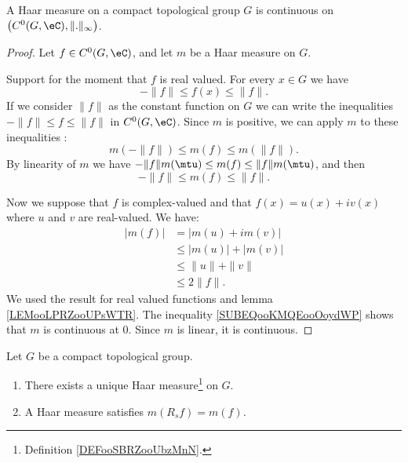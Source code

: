 \begin{lemma}     \label{LEMooRWOFooDOSUYo}
    A Haar measure on a compact topological group \( G\) is continuous on \( \big( C^0(G,\eC), \| . \|_{\infty} \big)\).
\end{lemma}

\begin{proof}
    Let \( f\in C^0(G,\eC)\), and let \( m\) be a Haar measure on \( G\). 

    Support for the moment that \( f\) is real valued. For every \( x\in G\) we have
    \begin{equation}
        -\| f \|\leq f(x)\leq \| f \|.
    \end{equation}
    If we consider \( \| f \|\) as the constant function on \( G\) we can write the inequalities \( -\| f \|\leq f\leq \| f \|\) in \( C^0(G,\eC)\).  Since \( m\) is positive, we can apply \( m\) to these inequalities :
    \begin{equation}
        m(-\| f \|)\leq m(f)\leq m(\| f \|).
    \end{equation}
    By linearity of \( m\) we have \( -\| f \|m(\mtu)\leq m(f)\leq \| f \|m(\mtu)\), and then
    \begin{equation}
        -\| f \|\leq m(f)\leq \| f \|.
    \end{equation}
    
    Now we suppose that \( f\) is complex-valued and that \( f(x)=u(x)+iv(x)\) where \( u\) and \( v\) are real-valued. We have:
    \begin{subequations}        \label{SUBEQooKMQEooOoydWP}
        \begin{align}
            | m(f) |&=| m(u)+im(v) |\\
            &\leq | m(u) |+| m(v) |\\
            &\leq \| u \|+\| v \|\\
            &\leq 2\| f \|.
        \end{align}
    \end{subequations}
    We used the result for real valued functions and lemma \ref{LEMooLPRZooUPsWTR}. The inequality \eqref{SUBEQooKMQEooOoydWP} shows that \( m\) is continuous at \( 0\). Since \( m\) is linear, it is continuous.
\end{proof}

\begin{theorem}       \label{THOooHZNRooLWmJMB}
    Let \( G\) be a compact topological group. 
    \begin{enumerate}
        \item
            There exists a unique Haar measure\footnote{Definition \ref{DEFooSBRZooUbzMnN}.} on \( G\).
        \item
            A Haar measure satisfies \( m(R_sf)=m(f)\).
    \end{enumerate}
\end{theorem}

